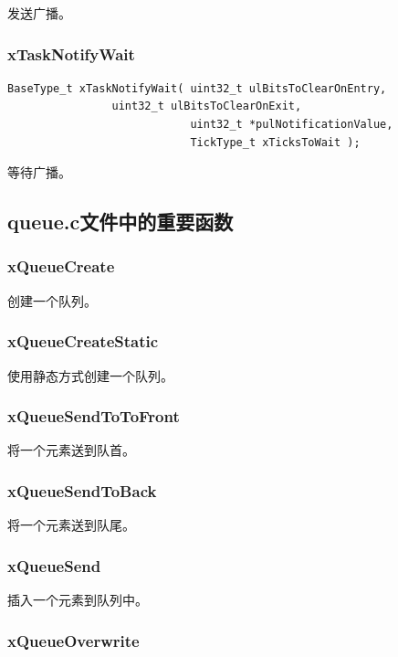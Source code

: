 \documentclass[12pt, a4paper]{article}
\begin{document}
发送广播。

\subsubsection {xTaskNotifyWait}
\begin{lstlisting}[language={[ANSI]C},keywordstyle=\color{blue!70},commentstyle=\color{red!50!green!50!blue!50},frame=shadowbox, rulesepcolor=\color{red!20!green!20!blue!20}]
BaseType_t xTaskNotifyWait( uint32_t ulBitsToClearOnEntry, 
			    uint32_t ulBitsToClearOnExit, 
                            uint32_t *pulNotificationValue, 
                            TickType_t xTicksToWait );
\end{lstlisting}

等待广播。



\subsection {queue.c文件中的重要函数}

\subsubsection {xQueueCreate}

创建一个队列。

\subsubsection {xQueueCreateStatic}

使用静态方式创建一个队列。

\subsubsection {xQueueSendToToFront}

将一个元素送到队首。

\subsubsection {xQueueSendToBack}

将一个元素送到队尾。

\subsubsection {xQueueSend}

插入一个元素到队列中。

\subsubsection {xQueueOverwrite}
\end{document}
